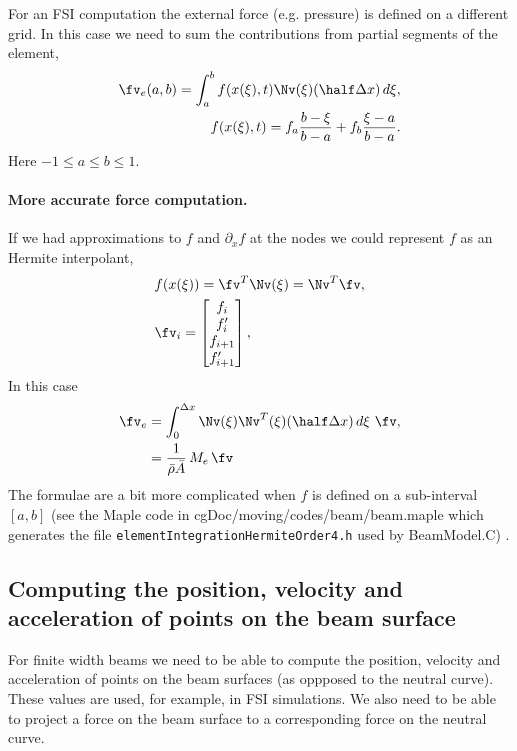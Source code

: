 \documentclass[11pt]{article}
\newcommand{\rhos}{\bar{\rho}}
\newcommand{\As}{\bar{A}}
\begin{document}
For an FSI computation the external force (e.g. pressure) is defined on a different grid. In this case we need
to sum the contributions from partial segments of the element,
\begin{align}
 \fv_e(a,b) = \int_a^{b} f(x(\xi),t) \Nv(\xi) (\half \dx) \, d\xi, \\
   f(x(\xi),t) = f_a\frac{b-\xi}{b-a}  + f_b \frac{\xi-a}{b-a} .
\end{align} 
Here $-1\le a \le b \le 1$. 

\paragraph{More accurate force computation.} If we had approximations to $f$ and $\partial_x f$ at the nodes we
could represent $f$ as an Hermite interpolant,
\begin{align}
&  f(x(\xi)) =  \fv^T \Nv(\xi) = \Nv^T\fv , \\
&  \fv_i = \begin{bmatrix} 
 f_i \\  f'_i \\ f_{i+1} \\ f'_{i+1}
              \end{bmatrix},
\end{align} 
In this case 
\begin{align}
 \fv_e &= \int_0^{\dx} \Nv(\xi) \Nv^T(\xi)  (\half \dx) \, d\xi ~\fv, \\
       &= \frac{1}{\rhos\As} \, M_e \, \fv
\end{align} 
The formulae are a bit more complicated when $f$ is defined on a sub-interval $[a,b]$ (see the Maple
code in cgDoc/moving/codes/beam/beam.maple which generates the file {\tt elementIntegrationHermiteOrder4.h} 
used by BeamModel.C)  .

\subsection{Computing the position, velocity and acceleration of points on the beam surface}

For finite width beams we need to be able to compute the position, velocity and acceleration
of points on the beam surfaces (as oppposed to the neutral curve). These values are used, for example,
in FSI simulations.
We also need to be able to project a force on the beam surface to a corresponding force on the
neutral curve. 
\end{document}
